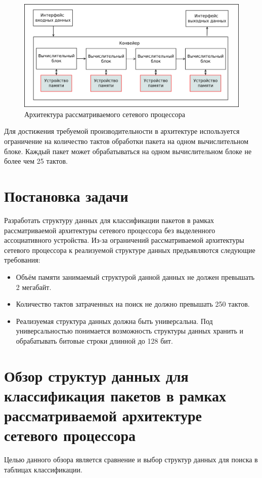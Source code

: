 \documentclass[a4peper, 12pt, titlepage, finall]{report}
\begin{document}
        \begin{figure}[h]
            \includegraphics[width=\textwidth]{npu_all.png}
            \caption{Архитектура рассматриваемого сетевого процессора}
        \end{figure}
        Для достижения требуемой производительности в архитектуре используется ограничение на количество тактов обработки пакета
        на одном вычислительном блоке. Каждый пакет может обрабатываться на одном вычислительном блоке не более чем 25 тактов.
        
    \chapter{Постановка задачи} 
        Разработать структуру данных для классификации пакетов в рамках рассматриваемой архитектуры сетевого процессора без выделенного ассоциативного устройства. 
        Из-за ограничений рассматриваемой архитектуры сетевого процессора к реализуемой структуре данных предъявляются следующие требования:

        \begin{itemize}
            \item Объём памяти занимаемый структурой данной данных не должен превышать 2 мегабайт.
            \item Количество тактов затраченных на поиск не должно превышать 250 тактов.
            \item Реализуемая структура данных должна быть универсальна. Под универсальностью понимается возможность структуры данных хранить и обрабатывать битовые строки длинной до 128 бит.
        \end{itemize}
    \chapter{Обзор структур данных для классификация пакетов в рамках рассматриваемой архитектуре сетевого процессора}
        Целью данного обзора является сравнение и выбор структур данных для поиска в таблицах классификации. 
\end{document}
